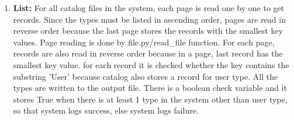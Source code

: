 \documentclass{article}
\begin{document}
\begin{enumerate}
    \item \textbf{List:} For all catalog files in the system, each page is read one by one to get records. Since the types must be listed in ascending order, pages are read in reverse order because the last page stores the records with the smallest key values. Page reading is done by file.py\slash read\_file function. For each page, records are also read in reverse order because in a page, last record has the smallest key value. for each record it is checked whether the key contains the substring 'User' because catalog also stores a record for user type. All the types are written to the output file. There is a boolean check variable and it stores True when there is at least 1 type in the system other than user type, so that system logs success, else system logs failure.
    
\end{enumerate}
\end{document}
